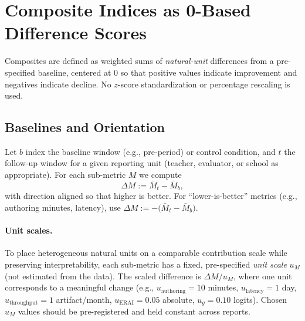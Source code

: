 \documentclass[11pt]{article}
\newcommand{\ERAI}{\mathrm{ERAI}}
\begin{document}
\section{Composite Indices as 0-Based Difference Scores}
\label{sec:diff-composites}
Composites are defined as weighted sums of \emph{natural-unit} differences from a pre-specified baseline, centered at 0 so that positive values indicate improvement and negatives indicate decline. No $z$-score standardization or percentage rescaling is used.

\subsection{Baselines and Orientation}
Let $b$ index the baseline window (e.g., pre-period) or control condition, and $t$ the follow-up window for a given reporting unit (teacher, evaluator, or school as appropriate). For each sub-metric $M$ we compute
\begin{equation}
\Delta M := \bar{M}_{t} - \bar{M}_{b},
\end{equation}
with direction aligned so that higher is better. For ``lower-is-better'' metrics (e.g., authoring minutes, latency), use $\Delta M := -\bigl(\bar{M}_{t} - \bar{M}_{b}\bigr)$.

\paragraph{Unit scales.} To place heterogeneous natural units on a comparable contribution scale while preserving interpretability, each sub-metric has a fixed, pre-specified \emph{unit scale} $u_M$ (not estimated from the data). The scaled difference is $\Delta M / u_M$, where one unit corresponds to a meaningful change (e.g., $u_{\text{authoring}}=10$ minutes, $u_{\text{latency}}=1$ day, $u_{\text{throughput}}=1$ artifact/month, $u_{\ERAI}=0.05$ absolute, $u_{g}=0.10$ logits). Chosen $u_M$ values should be pre-registered and held constant across reports.
\end{document}
